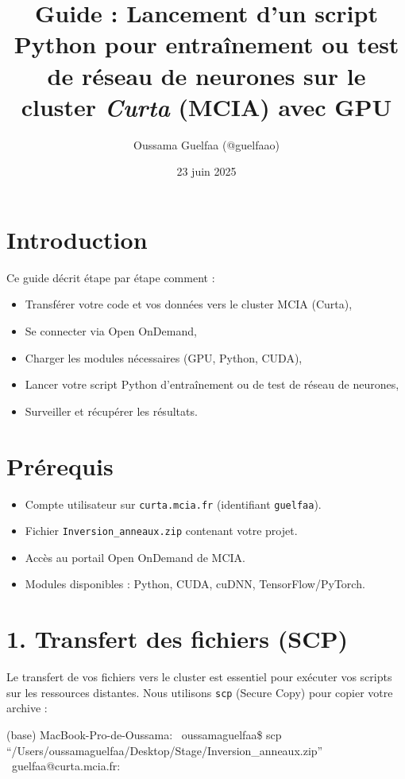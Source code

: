\documentclass[a4paper,12pt]{article}
\title{Guide : Lancement d’un script Python pour \textbf{entraînement} ou \textbf{test} de réseau de neurones sur le cluster \textit{Curta} (MCIA) avec GPU}
\author{Oussama Guelfaa (@guelfaao)}
\date{23 juin 2025}
\begin{document}
\maketitle

\tableofcontents
\newpage

\section{Introduction}
Ce guide décrit étape par étape comment :
\begin{itemize}
\item Transférer votre code et vos données vers le cluster MCIA (Curta),
\item Se connecter via Open OnDemand,
\item Charger les modules nécessaires (GPU, Python, CUDA),
\item Lancer votre script Python d’entraînement ou de test de réseau de neurones,
\item Surveiller et récupérer les résultats.
\end{itemize}

\section{Prérequis}
\begin{itemize}
\item Compte utilisateur sur \texttt{curta.mcia.fr} (identifiant \texttt{guelfaa}).
\item Fichier \texttt{Inversion\_anneaux.zip} contenant votre projet.
\item Accès au portail Open OnDemand de MCIA.
\item Modules disponibles : Python, CUDA, cuDNN, TensorFlow/PyTorch.
\end{itemize}

\section{1. Transfert des fichiers (SCP)}
Le transfert de vos fichiers vers le cluster est essentiel pour exécuter vos scripts sur les ressources distantes. Nous utilisons \texttt{scp} (Secure Copy) pour copier votre archive :

\begin{terminal}
(base) MacBook-Pro-de-Oussama:~ oussamaguelfaa\$ scp “/Users/oussamaguelfaa/Desktop/Stage/Inversion\_anneaux.zip” \
guelfaa@curta.mcia.fr:~
\end{terminal}
\end{document}
